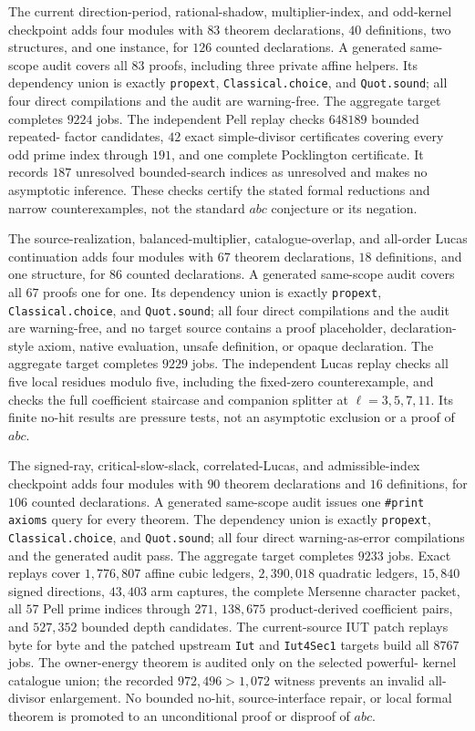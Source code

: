 \documentclass[11pt]{amsart}
\theoremstyle{definition}
\theoremstyle{remark}
\begin{document}
The current direction-period, rational-shadow, multiplier-index, and
odd-kernel checkpoint adds four modules with $83$ theorem declarations, $40$
definitions, two structures, and one instance, for $126$ counted declarations.
A generated same-scope audit covers all $83$ proofs, including three private
affine helpers.  Its dependency union is exactly \texttt{propext},
\texttt{Classical.choice}, and \texttt{Quot.sound}; all four direct
compilations and the audit are warning-free.  The aggregate target completes
$9224$ jobs.  The independent Pell replay checks $648189$ bounded repeated-
factor candidates, $42$ exact simple-divisor certificates covering every odd
prime index through $191$, and one complete Pocklington certificate.  It
records $187$ unresolved bounded-search indices as unresolved and makes no
asymptotic inference.  These checks certify the stated formal reductions and
narrow counterexamples, not the standard $abc$ conjecture or its negation.

The source-realization, balanced-multiplier, catalogue-overlap, and all-order
Lucas continuation adds four modules with $67$ theorem declarations, $18$
definitions, and one structure, for $86$ counted declarations.  A generated
same-scope audit covers all $67$ proofs one for one.  Its dependency union is
exactly \texttt{propext}, \texttt{Classical.choice}, and
\texttt{Quot.sound}; all four direct compilations and the audit are
warning-free, and no target source contains a proof placeholder, declaration-
style axiom, native evaluation, unsafe definition, or opaque declaration.
The aggregate target completes $9229$ jobs.  The independent Lucas replay
checks all five local residues modulo five, including the fixed-zero
counterexample, and checks the full coefficient staircase and companion
splitter at $\ell=3,5,7,11$.  Its finite no-hit results are pressure tests,
not an asymptotic exclusion or a proof of $abc$.

The signed-ray, critical-slow-slack, correlated-Lucas, and admissible-index
checkpoint adds four modules with $90$ theorem declarations and $16$
definitions, for $106$ counted declarations.  A generated same-scope audit
issues one \texttt{\#print axioms} query for every theorem.  The dependency
union is exactly \texttt{propext}, \texttt{Classical.choice}, and
\texttt{Quot.sound}; all four direct warning-as-error compilations and the
generated audit pass.  The aggregate target completes $9233$ jobs.  Exact
replays cover $1{,}776{,}807$ affine cubic ledgers, $2{,}390{,}018$ quadratic
ledgers, $15{,}840$ signed directions, $43{,}403$ arm captures, the complete
Mersenne character packet, all $57$ Pell prime indices through $271$,
$138{,}675$ product-derived coefficient pairs, and $527{,}352$ bounded depth
candidates.  The current-source IUT patch replays byte for byte and the
patched upstream \texttt{Iut} and \texttt{Iut4Sec1} targets build all $8767$
jobs.  The owner-energy theorem is audited only on the selected powerful-
kernel catalogue union; the recorded $972{,}496>1{,}072$ witness prevents an
invalid all-divisor enlargement.  No bounded no-hit, source-interface repair,
or local formal theorem is promoted to an unconditional proof or disproof of
$abc$.
\end{document}
